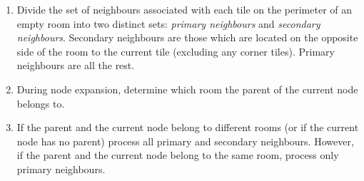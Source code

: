 
\begin{enumerate}
\item{Divide the set of neighbours associated with each tile on the perimeter of an empty room into two distinct sets:
\emph{primary neighbours} and \emph{secondary neighbours}.
Secondary neighbours are those which are located on the opposite side of the
room to the current tile  (excluding any corner tiles).
Primary neighbours are all the rest.}
\item{During node expansion, determine which room the parent of the current node belongs to.}
\item{If the parent and the current node belong to different rooms (or if the current node has no parent) 
process all primary and secondary neighbours.
However, if the parent and the current node belong to the same room, process only primary neighbours.}
\end{enumerate}

